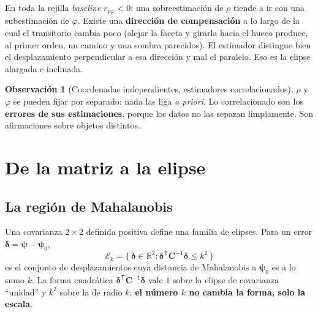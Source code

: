 \documentclass[11pt,a4paper]{article}
\newcommand{\vect}[1]{\boldsymbol{#1}}
\newcommand{\matr}[1]{\mathbf{#1}}
\theoremstyle{definition}
\newtheorem{obs}{Observación}
\theoremstyle{plain}
\begin{document}
En toda la rejilla \emph{baseline} $r_{\rho\varphi}<0$: una sobreestimaci\'on de
$\rho$ tiende a ir con una subestimaci\'on de $\varphi$. Existe una
\textbf{direcci\'on de compensaci\'on} a lo largo de la cual el transitorio
cambia poco (alejar la faceta y girarla hacia el hueco produce, al primer
orden, un camino y una sombra parecidos). El estimador distingue bien el
desplazamiento perpendicular a esa direcci\'on y mal el paralelo. Eso es la
elipse alargada e inclinada.

\begin{obs}[Coordenadas independientes, estimadores correlacionados]
$\rho$ y $\varphi$ se pueden fijar por separado: nada las liga \emph{a priori}.
Lo correlacionado son los \textbf{errores de sus estimaciones}, porque los
datos no las separan limpiamente. Son afirmaciones sobre objetos distintos.
\end{obs}

\section{De la matriz a la elipse}
\label{sec:elipse}

\subsection{La regi\'on de Mahalanobis}

Una covarianza $2\times 2$ definida positiva define una familia de elipses.
Para un error $\vect\delta=\vect\psi-\vect\psi_0$,
%
\begin{equation}
\label{eq:region}
\mathcal E_k
= \bigl\{\,
    \vect\delta\in\mathbb R^2 :
    \vect\delta^{\mathsf T}\matr C^{-1}\vect\delta \le k^2
  \,\bigr\}
\end{equation}
%
es el conjunto de desplazamientos cuya distancia de Mahalanobis a $\vect\psi_0$
es a lo sumo $k$. La forma cuadr\'atica $\vect\delta^{\mathsf T}\matr C^{-1}
\vect\delta$ vale $1$ sobre la elipse de covarianza \enquote{unidad} y $k^2$
sobre la de radio $k$: \textbf{el n\'umero $k$ no cambia la forma, solo la
escala}.
\end{document}
